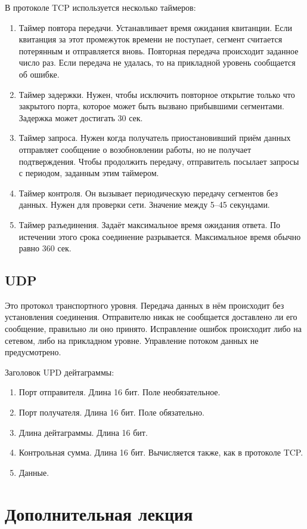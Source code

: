 \documentclass[12pt, russian, oneside, article]{ncc}
\begin{document}
В протоколе TCP используется несколько таймеров:
\begin{enumerate}
\item Таймер повтора передачи. Устанавливает время ожидания квитанции. Если квитанция за этот промежуток времени не поступает, сегмент считается потерянным и отправляется вновь. Повторная передача происходит заданное число раз. Если передача не удалась, то на прикладной уровень сообщается об ошибке.
\item Таймер задержки. Нужен, чтобы исключить повторное открытие только что закрытого порта, которое может быть вызвано прибывшими сегментами. Задержка может достигать 30 сек.
\item Таймер запроса. Нужен когда получатель приостановивший приём данных отправляет сообщение о возобновлении работы, но не получает подтверждения. Чтобы продолжить передачу, отправитель посылает запросы с периодом, заданным этим таймером.
\item Таймер контроля. Он вызывает периодическую передачу сегментов без данных. Нужен для проверки сети. Значение между 5--45 секундами.
\item Таймер разъединения. Задаёт максимальное время ожидания ответа. По истечении этого срока соединение разрывается. Максимальное время обычно равно 360 сек.
\end{enumerate}
\subsection{UDP}
\label{sec-5_2}


Это протокол транспортного уровня. Передача данных в нём происходит без установления соединения. Отправителю никак не сообщается доставлено ли его сообщение, правильно ли оно принято. Исправление ошибок происходит либо на сетевом, либо на прикладном уровне. Управление потоком данных не предусмотрено.

Заголовок UPD дейтаграммы:
\begin{enumerate}
\item Порт отправителя. Длина 16 бит. Поле необязательное.
\item Порт получателя. Длина 16 бит. Поле обязательно.
\item Длина дейтаграммы. Длина 16 бит.
\item Контрольная сумма. Длина 16 бит. Вычисляется также, как в протоколе TCP.
\item Данные.
\end{enumerate}
\section{Дополнительная лекция}
\label{sec-6}
\end{document}

